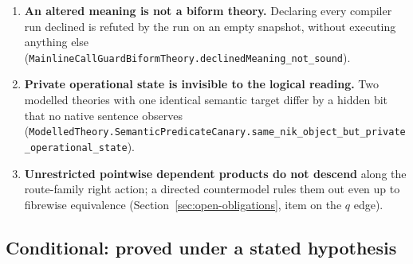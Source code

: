 \documentclass[11pt]{article}
\theoremstyle{definition}
\theoremstyle{remark}
\begin{document}
\begin{enumerate}
  only (\nolinkurl{IdentityNotions.Temporal.lineage_without_identity},
  \nolinkurl{coarse_cannot_mint_fine}, \nolinkurl{coarse_cannot_mint_equations},
  \nolinkurl{marker_not_descends_coarse}).
\item \textbf{An altered meaning is not a biform theory.}  Declaring every
  compiler run declined is refuted by the run on an empty snapshot, without
  executing anything else
  (\nolinkurl{MainlineCallGuardBiformTheory.declinedMeaning_not_sound}).
\item \textbf{Private operational state is invisible to the logical reading.}
  Two modelled theories with one identical semantic target differ by a
  hidden bit that no native sentence observes
  (\nolinkurl{ModelledTheory.SemanticPredicateCanary.same_nik_object_but_private_operational_state}).
\item \textbf{Unrestricted pointwise dependent products do not descend}
  along the route-family right action; a directed countermodel rules them out
  even up to fibrewise equivalence (Section~\ref{sec:open-obligations}, item
  on the $q$ edge).
\end{enumerate}

\subsection{Conditional: proved under a stated hypothesis}
\end{document}
